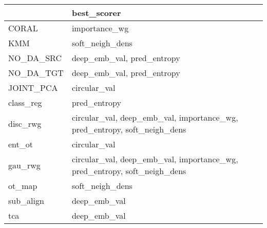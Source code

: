\begin{tabular}{ll}
\hline
           & best\_scorer                                                              \\
\hline
 CORAL     & importance\_wg                                                            \\
 KMM       & soft\_neigh\_dens                                                          \\
 NO\_DA\_SRC & deep\_emb\_val, pred\_entropy                                               \\
 NO\_DA\_TGT & deep\_emb\_val, pred\_entropy                                               \\
 JOINT\_PCA & circular\_val                                                             \\
 class\_reg & pred\_entropy                                                             \\
 disc\_rwg  & circular\_val, deep\_emb\_val, importance\_wg, pred\_entropy, soft\_neigh\_dens \\
 ent\_ot    & circular\_val                                                             \\
 gau\_rwg   & circular\_val, deep\_emb\_val, importance\_wg, pred\_entropy, soft\_neigh\_dens \\
 ot\_map    & soft\_neigh\_dens                                                          \\
 sub\_align & deep\_emb\_val                                                             \\
 tca       & deep\_emb\_val                                                             \\
\hline
\end{tabular}